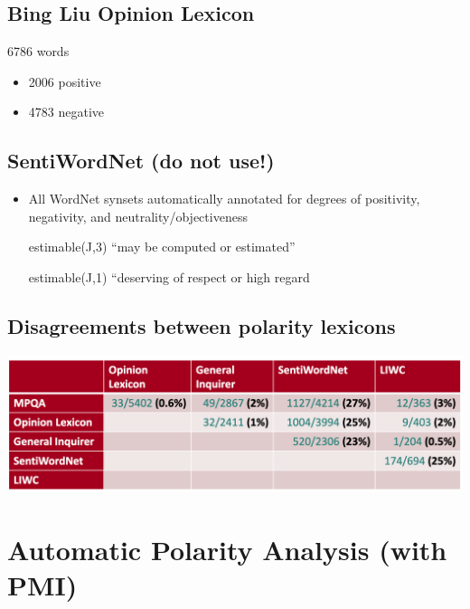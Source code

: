 \documentclass[11pt]{article}
\theoremstyle{definition}
\begin{document}
\subsection{Bing Liu Opinion Lexicon}
6786 words
\begin{itemize}
  \item 2006 positive
  \item 4783 negative
\end{itemize}

\subsection{SentiWordNet (do not use!)}
\begin{itemize}
  \item All WordNet synsets automatically annotated for degrees of positivity,
  negativity, and neutrality/objectiveness
  \item [estimable(J,3)] “may be computed or estimated”
  \item [estimable(J,1)] “deserving of respect or high regard
\end{itemize}

\subsection{Disagreements between polarity lexicons}
\includegraphics[width=\textwidth]{14.png}

\section{Automatic Polarity
Analysis (with PMI)}
\end{document}
